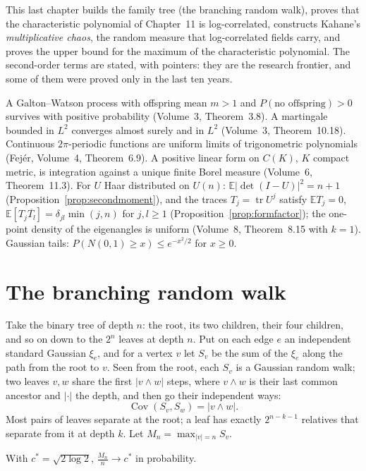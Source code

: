 This last chapter builds the family tree (the branching random walk), proves that the characteristic polynomial of Chapter~11 is log-correlated, constructs Kahane's \emph{multiplicative chaos}, the random measure that
log-correlated fields carry, and proves the upper bound for the maximum of the characteristic polynomial. The second-order terms are stated, with pointers: they are the research frontier, and some of them were proved
only in the last ten years.

\begin{reminder}
A Galton--Watson process with offspring mean $m>1$ and $P(\text{no offspring})>0$ survives with positive probability (Volume~3, Theorem~3.8). A martingale bounded in $L^2$ converges almost surely and in $L^2$ (Volume~3, Theorem~10.18).
Continuous $2\pi$-periodic functions are uniform limits of trigonometric polynomials (Fej\'er, Volume~4, Theorem~6.9). A positive linear form on $C(K)$, $K$ compact metric, is integration against a unique finite Borel measure
(Volume~6, Theorem~11.3). For $U$ Haar distributed on $U(n)$: $\mathbb E|\det(I-U)|^2=n+1$ (Proposition~\ref{prop:secondmoment}), and the traces $T_j=\operatorname{tr}U^j$ satisfy $\mathbb ET_j=0$, $\mathbb E[T_j\overline{T_l}]=\delta_{jl}\min(j,n)$ for $j,l\ge1$
(Proposition~\ref{prop:formfactor}); the one-point density of the eigenangles is uniform (Volume~8, Theorem~8.15 with $k=1$). Gaussian tails: $P(N(0,1)\ge x)\le e^{-x^2/2}$ for $x\ge0$.
\end{reminder}

\section{The branching random walk}

Take the binary tree of depth $n$: the root, its two children, their four children, and so on down to the $2^n$ leaves at depth $n$. Put on each edge $e$ an independent standard Gaussian $\xi_e$, and for a vertex $v$ let $S_v$ be the sum
of the $\xi_e$ along the path from the root to $v$. Seen from the root, each $S_v$ is a Gaussian random walk; two leaves $v,w$ share the first $|v\wedge w|$ steps, where $v\wedge w$ is their last common ancestor and $|\cdot|$ the depth, and then
go their independent ways:
\[
\operatorname{Cov}(S_v,S_w)=|v\wedge w|.
\]
Most pairs of leaves separate at the root; a leaf has exactly $2^{n-k-1}$ relatives that separate from it at depth $k$. Let $M_n=\max_{|v|=n}S_v$.

\begin{theorem}\label{thm:brwspeed}
With $c^*=\sqrt{2\log2}$, $\frac{M_n}n\to c^*$ in probability.
\end{theorem}

